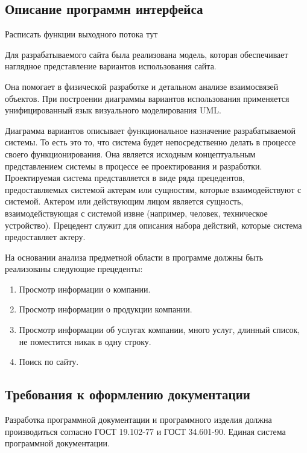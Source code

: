 \subsection{Описание программн интерфейса}
Расписать функции выходного потока тут

Для разрабатываемого сайта была реализована модель, которая обеспечивает наглядное представление вариантов использования сайта.

Она помогает в физической разработке и детальном анализе взаимосвязей объектов. При построении диаграммы вариантов использования применяется унифицированный язык визуального моделирования UML.

Диаграмма вариантов описывает функциональное назначение разрабатываемой системы. То есть это то, что система будет непосредственно делать в процессе своего функционирования. Она является исходным концептуальным представлением системы в процессе ее проектирования и разработки. Проектируемая система представляется в виде ряда прецедентов, предоставляемых системой актерам или сущностям, которые взаимодействуют с системой. Актером или действующим лицом является сущность, взаимодействующая с системой извне (например, человек, техническое устройство). Прецедент служит для описания набора действий, которые система предоставляет актеру.

На основании анализа предметной области в программе должны быть реализованы следующие прецеденты:
\begin{enumerate}
\item Просмотр информации о компании.
\item Просмотр информации о продукции компании.
\item Просмотр информации об услугах компании, много услуг, длинный список, не поместится никак в одну строку.
\item Поиск по сайту.
\end{enumerate}

\subsection{Требования к оформлению документации}

Разработка программной документации и программного изделия должна производиться согласно ГОСТ 19.102-77 и ГОСТ 34.601-90. Единая система программной документации.
